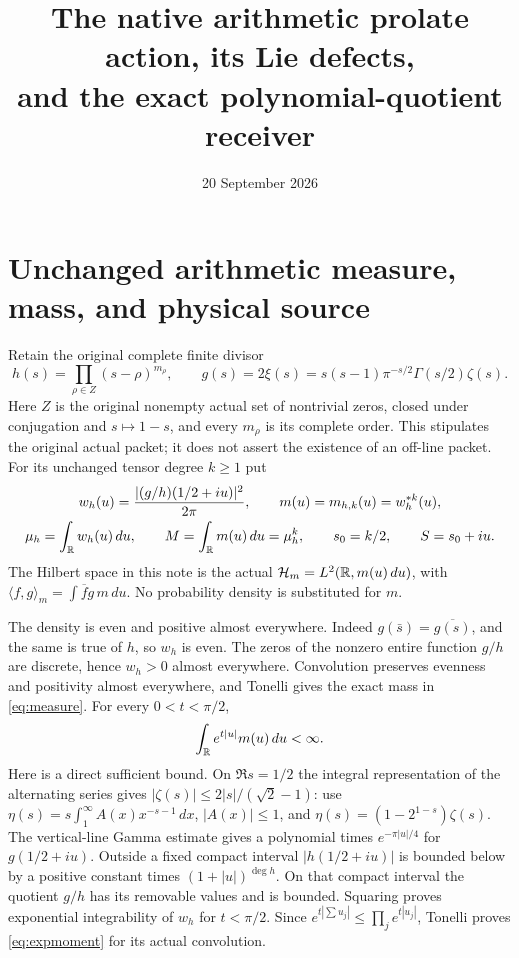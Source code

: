 \documentclass[11pt]{article}
\title{The native arithmetic prolate action, its Lie defects,\\
and the exact polynomial-quotient receiver}
\author{}\date{20 September 2026}
\begin{document}
\maketitle

\section{Unchanged arithmetic measure, mass, and physical source}

Retain the original complete finite divisor
\[
 h(s)=\prod_{\rho\in Z}(s-\rho)^{m_\rho},\qquad
 g(s)=2\xi(s)=s(s-1)\pi^{-s/2}\Gamma(s/2)\zeta(s).
\]
Here $Z$ is the original nonempty actual set of nontrivial zeros,
closed under conjugation and $s\mapsto1-s$, and every $m_\rho$
is its complete order. This stipulates the original actual packet;
it does not assert the existence of an off-line packet. For its
unchanged tensor degree $k\geq1$ put
\begin{equation}\label{eq:measure}
 \begin{gathered}
 w_h(u)=\frac{|(g/h)(1/2+iu)|^2}{2\pi},\qquad
 m(u)=m_{h,k}(u)=w_h^{*k}(u),\\
 \mu_h=\int_\mathbb R w_h(u)\,du,\qquad
 M=\int_\mathbb R m(u)\,du=\mu_h^k,\qquad s_0=k/2,\qquad S=s_0+iu.
 \end{gathered}
\end{equation}
The Hilbert space in this note is the actual
$\mathcal H_m=L^2(\mathbb R,m(u)\,du)$, with
$\langle f,g\rangle_m=\int\overline f g\,m\,du$.
No probability density is substituted for $m$.

The density is even and positive almost everywhere. Indeed
$g(\bar s)=\overline{g(s)}$, and the same is true of $h$,
so $w_h$ is even. The zeros of the nonzero entire function
$g/h$ are discrete, hence $w_h>0$ almost everywhere.
Convolution preserves evenness and positivity almost everywhere,
and Tonelli gives the exact mass in \eqref{eq:measure}.
For every $0<t<\pi/2$,
\begin{equation}\label{eq:expmoment}
 \int_\mathbb R e^{t|u|}m(u)\,du<\infty.
\end{equation}
Here is a direct sufficient bound. On $\Re s=1/2$ the integral
representation of the alternating series gives
$|\zeta(s)|\leq2|s|/(\sqrt2-1)$: use
$\eta(s)=s\int_1^\infty A(x)x^{-s-1}\,dx$, $|A(x)|\leq1$,
and $\eta(s)=(1-2^{1-s})\zeta(s)$.
The vertical-line Gamma estimate gives a polynomial times
$e^{-\pi|u|/4}$ for $g(1/2+iu)$. Outside a fixed compact interval
$|h(1/2+iu)|$ is bounded below by a positive constant times
$(1+|u|)^{\deg h}$. On that compact interval the quotient
$g/h$ has its removable values and is bounded. Squaring proves
exponential integrability of $w_h$ for $t<\pi/2$.
Since $e^{t|\sum u_j|}\leq\prod_j e^{t|u_j|}$, Tonelli proves
\eqref{eq:expmoment} for its actual convolution.
\end{document}
